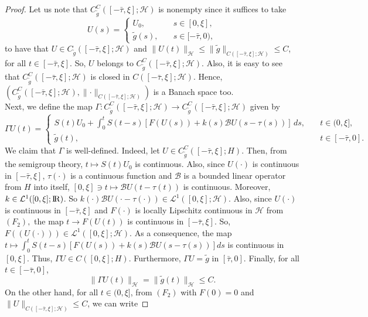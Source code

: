 \documentclass[11pt]{article}
\newcommand{\RR}{{{\rm I} \kern -.15em {\rm R} }}
\renewcommand{\leq}{\leqslant}
\begin{document}
\begin{proof}
	Let us note that $C^C_{\tilde{g}}([-\bar\tau,\xi];{\mathcal H})$ is nonempty since it suffices to take 
	$$U(s)=\begin{cases}
		U_0,\quad &s\in [0,\xi],\\
		\tilde{g}(s), \quad& s\in [-\bar{\tau},0),
	\end{cases}$$
to have that $U\in C_{\tilde{g}}([-\bar\tau,\xi];{\mathcal H})$ and $\lVert U(t)\rVert_{\mathcal{H}}\leq \lVert \tilde{g}\rVert_{C([-\bar\tau,\xi];{\mathcal H})}\leq C$, for all $t\in [-\bar\tau,\xi]$. So, $U$ belongs to $C^C_{\tilde{g}}([-\bar\tau,\xi];{\mathcal H})$. Also, it is easy to see that $C^C_{\tilde{g}}([-\bar\tau,\xi];{\mathcal H})$ is closed in $C([-\bar\tau,\xi];{\mathcal H})$. Hence, $( C^C_{\tilde{g}}([-\bar\tau,\xi];{\mathcal H}),\lVert \cdot\rVert_{C([-\bar\tau,\xi];{\mathcal H})})$ is a Banach space too.
\\Next, we define the map
	$\Gamma:C^C_{\tilde{g}}([-\bar\tau,\xi];{\mathcal H})\rightarrow C^C_{\tilde{g}}([-\bar\tau,\xi];{\mathcal H})$ given by
	$$\Gamma U(t)=\begin{cases}
		S(t)U_0+\int_{0}^t S(t-s)[F(U(s))+k(s)\mathcal{B}U(s-\tau(s))]\, ds,\quad &t\in (0,\xi],
		\\\tilde{g}(t),\quad &t\in [-\bar{\tau},0].
	\end{cases}$$
We claim that $\Gamma$ is well-defined. Indeed, let $U\in C^C_{\tilde{g}}([-\bar{\tau},\xi];H)$. Then, from the semigroup theory, $t\mapsto S(t)U_0$ is continuous. Also, since $U(\cdot)$ is continuous in $[-\bar{\tau},\xi]$, $\tau(\cdot)$ is a continuous function and ${\mathcal B}$ is a bounded linear operator from $H$ into itself, $[0,\xi]\ni t\mapsto {\mathcal B}U(t-\tau(t))$ is continuous. Moreover, $k\in {\mathcal L}^1([0,\xi];\RR )$. So $k(\cdot){\mathcal B}U(\cdot-\tau(\cdot))\in {\mathcal L}^1([0,\xi];\mathcal{H}  )$. Also, since $U(\cdot)$ is continuous in $[-\bar{\tau},\xi]$ and $F(\cdot)$ is locally Lipschitz continuous in $\mathcal{H}$ from $(F_2),$ the map $t\to F(U(t))$ is continuous in $[-\bar{\tau},\xi]$. So, $F((U(\cdot)))\in {\mathcal L}^1([0,\xi];\mathcal{H} )$. As a consequence, the map $t\mapsto \int_0^t S(t-s)[F(U(s))+ k(s){\mathcal B}U(s-\tau(s))]ds$ is continuous in $[0,\xi]$. Thus, $\Gamma U\in C([0,\xi];H)$. Furthermore, $\Gamma U=\tilde{g}$ in $[\bar{\tau},0]$. Finally, for all $t\in [-\bar{\tau},0]$, 
$$\lVert \Gamma U(t)\rVert_{\mathcal{H}}=\lVert \tilde{g}(t)\rVert_{\mathcal{H}}\leq C.$$
On the other hand, for all $t\in (0,\xi]$, from $(F_2)$ with $F(0)=0$ and $\lVert U\rVert_{C([-\bar\tau,\xi];{\mathcal H})}\leq C$, we can write

\end{proof}
\end{document}
